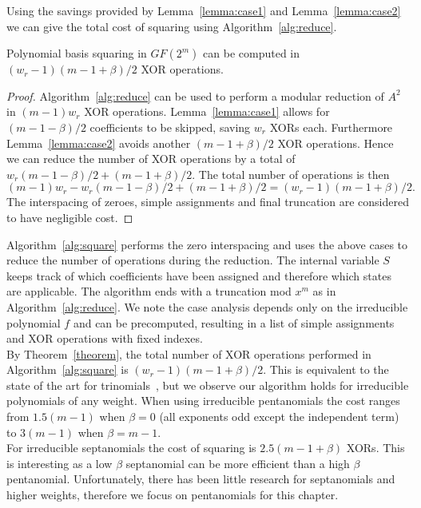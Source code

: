 \vspace{2mm}

Using the savings provided by Lemma~\ref{lemma:case1} and Lemma~\ref{lemma:case2} we can give the total cost of squaring using Algorithm~\ref{alg:reduce}.

\begin{thm} \label{theorem}
Polynomial basis squaring in $GF(2^m)$ can be computed in $(w_r-1) (m-1+\beta)/2$ XOR operations.
\end{thm}

\begin{proof}
    Algorithm~\ref{alg:reduce} can be used to perform a modular reduction of $A^2$ in $(m-1)w_r$ XOR operations. Lemma~\ref{lemma:case1} allows for $(m-1-\beta)/2$ coefficients to be skipped, saving $w_r$ XORs each. Furthermore Lemma~\ref{lemma:case2} avoids another $(m-1+\beta)/2$ XOR operations. Hence we can reduce the number of XOR operations by a total of $w_r (m-1-\beta)/2 + (m-1+\beta)/2$. The total number of operations is then $$(m-1)w_r - w_r (m-1-\beta)/2 + (m-1+\beta)/2 = (w_r-1) (m-1+\beta)/2.$$ The interspacing of zeroes, simple assignments and final truncation are considered to have negligible cost.
\end{proof}

Algorithm~\ref{alg:square} performs the zero interspacing and uses the above cases to reduce the number of operations during the reduction. The internal variable $S$ keeps track of which coefficients have been assigned and therefore which states are applicable. The algorithm ends with a truncation mod $x^m$ as in Algorithm~\ref{alg:reduce}. We note the case analysis depends only on the irreducible polynomial $f$ and can be precomputed, resulting in a list of simple assignments and XOR operations with fixed indexes. \\

By Theorem~\ref{theorem}, the total number of XOR operations performed in Algorithm~\ref{alg:square} is $(w_r-1) (m-1+\beta)/2$. This is equivalent to the state of the art for trinomials~\cite{wu2002bit}, but we observe our algorithm holds for irreducible polynomials of any weight. When using irreducible pentanomials the cost ranges from $1.5(m-1)$ when $\beta=0$ (all exponents odd except the independent term) to $3(m-1)$ when $\beta=m-1$. \\

For irreducible septanomials the cost of squaring is $2.5(m-1+\beta)$ XORs. This is interesting as a low $\beta$ septanomial can be more efficient than a high $\beta$ pentanomial. Unfortunately, there has been little research for septanomials and higher weights, therefore we focus on pentanomials for this chapter. \\

